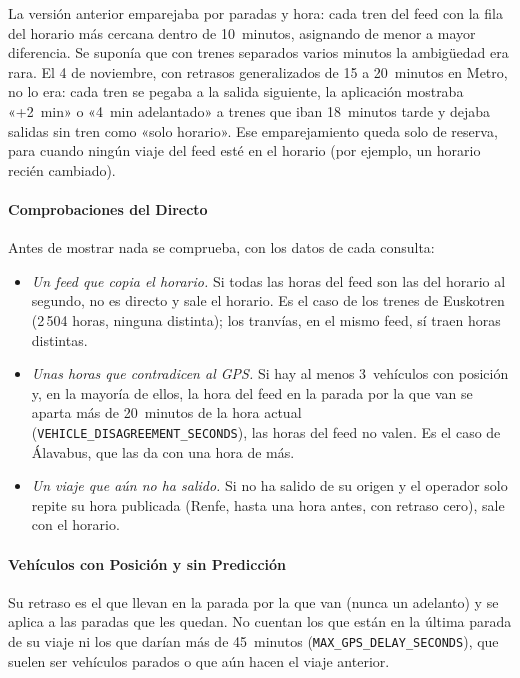 La versión anterior emparejaba por paradas y hora: cada tren del feed con la fila del horario más cercana dentro de
10~minutos, asignando de menor a mayor diferencia. Se suponía que con trenes separados varios minutos la ambigüedad era
rara. El 4 de noviembre, con retrasos generalizados de 15 a 20~minutos en Metro, no lo era: cada tren se pegaba a la
salida siguiente, la aplicación mostraba «+2~min» o «4~min adelantado» a trenes que iban 18~minutos tarde y dejaba
salidas sin tren como «solo horario». Ese emparejamiento queda solo de reserva, para cuando ningún viaje del feed esté
en el horario (por ejemplo, un horario recién cambiado).

\paragraph{Comprobaciones del Directo} Antes de mostrar nada se comprueba, con los datos de cada consulta:
\begin{itemize}
  \item \emph{Un feed que copia el horario.} Si todas las horas del feed son las del horario al segundo, no es
        directo y sale el horario. Es el caso de los trenes de Euskotren (2\,504 horas, ninguna distinta); los tranvías,
        en el mismo feed, sí traen horas distintas.
  \item \emph{Unas horas que contradicen al GPS.} Si hay al menos 3~vehículos con posición y, en la mayoría de ellos,
        la hora del feed en la parada por la que van se aparta más de 20~minutos de la hora actual
        (\texttt{VEHICLE\_DISAGREEMENT\_SECONDS}), las horas del feed no valen. Es el caso de Álavabus, que las da con una
        hora de más.
  \item \emph{Un viaje que aún no ha salido.} Si no ha salido de su origen y el operador solo repite su hora
        publicada (Renfe, hasta una hora antes, con retraso cero), sale con el horario.
\end{itemize}

\paragraph{Vehículos con Posición y sin Predicción} Su retraso es el que llevan en la parada por la que van (nunca un
adelanto) y se aplica a las paradas que les quedan. No cuentan los que están en la última parada de su viaje ni los que
darían más de 45~minutos (\texttt{MAX\_GPS\_DELAY\_SECONDS}), que suelen ser vehículos parados o que aún hacen el viaje
anterior.

